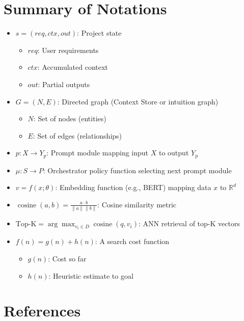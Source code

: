 \documentclass[11pt]{article}
\DeclareMathOperator{\cosine}{cosine}
\begin{document}
\section{Summary of Notations}
\label{app:notations}

\begin{itemize}
  \item \(s = (req, ctx, out)\): Project state  
    \begin{itemize}
      \item \(req\): User requirements  
      \item \(ctx\): Accumulated context  
      \item \(out\): Partial outputs
    \end{itemize}
  \item \(G = (N, E)\): Directed graph (Context Store or intuition graph)  
    \begin{itemize}
      \item \(N\): Set of nodes (entities)  
      \item \(E\): Set of edges (relationships)
    \end{itemize}
  \item \(p \colon X \to Y_p\): Prompt module mapping input \(X\) to output \(Y_p\)
  \item \(\mu \colon S \to P\): Orchestrator policy function selecting next prompt module
  \item \(v = f(x;\theta)\): Embedding function (e.g., BERT) mapping data \(x\) to \(\mathbb{R}^d\)
  \item \(\displaystyle \cosine(a,b) = \frac{a \cdot b}{\|a\|\|b\|}\): Cosine similarity metric
  \item \(\displaystyle \mathrm{Top\text{-}K} = \arg\max_{v_i\in D} \cosine(q,v_i)\): ANN retrieval of top-K vectors
  \item \(f(n)=g(n)+h(n)\): A\* search cost function  
    \begin{itemize}
      \item \(g(n)\): Cost so far  
      \item \(h(n)\): Heuristic estimate to goal
    \end{itemize}
\end{itemize}

\section{References}
\label{app:references}
\end{document}
